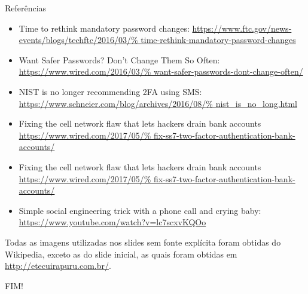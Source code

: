 \documentclass[utf8]{beamer}
\begin{document}
\begin{frame}{Referências}
  \fontsize{9pt}{9pt}\selectfont
  \begin{itemize}
    \item Time to rethink mandatory password changes:
          \url{https://www.ftc.gov/news-events/blogs/techftc/2016/03/%
               time-rethink-mandatory-password-changes}
    \item Want Safer Passwords? Don't Change Them So Often:
          \url{https://www.wired.com/2016/03/%
               want-safer-passwords-dont-change-often/}
    \item NIST is no longer recommending 2FA using SMS:
          \url{https://www.schneier.com/blog/archives/2016/08/%
               nist_is_no_long.html}
    \item Fixing the cell network flaw
          that lets hackers drain bank accounts
          \url{https://www.wired.com/2017/05/%
               fix-ss7-two-factor-authentication-bank-accounts/}
    \item Fixing the cell network flaw
          that lets hackers drain bank accounts
          \url{https://www.wired.com/2017/05/%
               fix-ss7-two-factor-authentication-bank-accounts/}
    \item Simple social engineering trick
          with a phone call and crying baby:
          \url{https://www.youtube.com/watch?v=lc7scxvKQOo}
  \end{itemize}
  Todas as imagens utilizadas nos slides sem fonte explícita
  foram obtidas do Wikipedia,
  exceto as do slide inicial,
  as quais foram obtidas em \url{http://etecuirapuru.com.br/}.
\end{frame}


\begin{frame}
  \begin{center}\fontsize{5cm}{2.5cm}\selectfont
    FIM!
  \end{center}
\end{frame}
\end{document}
